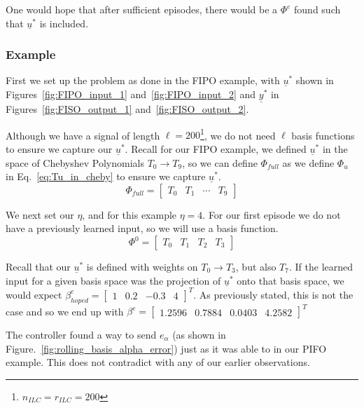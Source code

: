 One would hope that after sufficient episodes, there would be a $\Phi^e$ found such that $\underline{u}^\ast$ is included.

\FloatBarrier\subsubsection{Example}
First we set up the problem as done in the FIPO example, with $\underline{u}^\ast$ shown in Figures~\ref{fig:FIPO_input_1} and~\ref{fig:FIPO_input_2} and $\underline{y}^\ast$ in Figures~\ref{fig:FISO_output_1} and~\ref{fig:FISO_output_2}.

Although we have a signal of length $\ell = 200$\footnote{$n_{ILC} = r_{ILC} = 200$}, we do not need $\ell$ basis functions to ensure we capture our $\underline{u}^\ast$. Recall for our FIPO example, we defined $\underline{u}^\ast$ in the space of Chebyshev Polynomials $T_0 \to T_9$, so we can define $\Phi_{full}$ as we define $\Phi_u$ in Eq.~\ref{eq:Tu_in_cheby} to ensure we capture $\underline{u}^\ast$.
\begin{equation}
    \Phi_{full} =
    \begin{bmatrix}
        T_0 & T_1 & \cdots & T_9
    \end{bmatrix}
\end{equation}

We next set our $\eta$, and for this example $\eta = 4$. For our first episode we do not have a previously learned input, so we will use a basis function. 
\begin{equation}
    \Phi^0 =
    \begin{bmatrix}
        T_0 & T_1 & T_2 & T_3
    \end{bmatrix}
\end{equation}

Recall that our $\underline{u}^\ast$ is defined with weights on $T_0 \to T_3$, but also $T_7$. If the learned input for a given basis space was the projection of $\underline{u}^\ast$ onto that basis space, we would expect $\beta_{hoped}^e = {\begin{bmatrix}1 & 0.2 & -0.3 & 4\end{bmatrix}}^T$. As previously stated, this is not the case and so we end up with $\beta^e = {\begin{bmatrix}1.2596  &  0.7884  &  0.0403  &  4.2582\end{bmatrix}}^T$

The controller found a way to send $e_\alpha$ (as shown in Figure.~\ref{fig:rolling_basis_alpha_error}) just as it was able to in our PIFO example. This does not contradict with any of our earlier observations.

